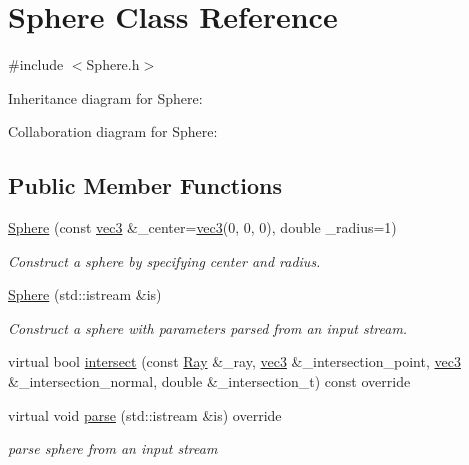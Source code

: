 \hypertarget{classSphere}{}\section{Sphere Class Reference}
\label{classSphere}


{\ttfamily \#include $<$Sphere.\+h$>$}



Inheritance diagram for Sphere\+:


Collaboration diagram for Sphere\+:
\subsection*{Public Member Functions}
\begin{DoxyCompactItemize}
\item 
\hyperlink{classSphere_a65c44103cb8b65e624b89db0aa4831e1}{Sphere} (const \hyperlink{classvec3}{vec3} \&\+\_\+center=\hyperlink{classvec3}{vec3}(0, 0, 0), double \+\_\+radius=1)
\begin{DoxyCompactList}\small\item\em Construct a sphere by specifying center and radius. \end{DoxyCompactList}\item 
\hyperlink{classSphere_acb3e0c818334dfbbcb0557a37a38ee85}{Sphere} (std\+::istream \&is)
\begin{DoxyCompactList}\small\item\em Construct a sphere with parameters parsed from an input stream. \end{DoxyCompactList}\item 
virtual bool \hyperlink{classSphere_a6650f14281c43b799d9ae0c0b690b1bd}{intersect} (const \hyperlink{classRay}{Ray} \&\+\_\+ray, \hyperlink{classvec3}{vec3} \&\+\_\+intersection\+\_\+point, \hyperlink{classvec3}{vec3} \&\+\_\+intersection\+\_\+normal, double \&\+\_\+intersection\+\_\+t) const override
\item 
virtual void \hyperlink{classSphere_aa55e3407f148feb451866bc39907f6fb}{parse} (std\+::istream \&is) override
\begin{DoxyCompactList}\small\item\em parse sphere from an input stream \end{DoxyCompactList}\end{DoxyCompactItemize}
